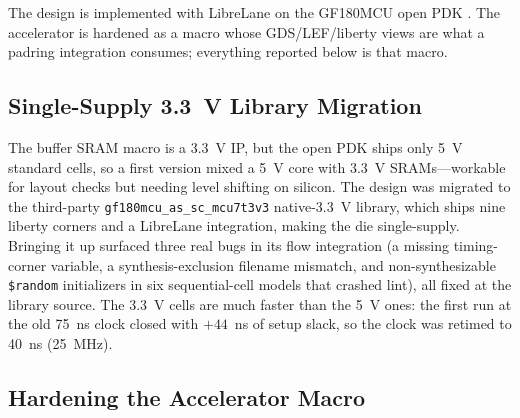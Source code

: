 \documentclass[conference,a4paper]{APSIPA2026}
\begin{document}
The design is implemented with LibreLane \cite{librelane} on the GF180MCU open PDK \cite{gf180pdk}. The accelerator is hardened as a macro whose GDS/LEF/liberty views are what a padring integration consumes; everything reported below is that macro.

\subsection{Single-Supply 3.3~V Library Migration}
The buffer SRAM macro \cite{gf180sram} is a 3.3~V IP, but the open PDK ships only 5~V standard cells, so a first version mixed a 5~V core with 3.3~V SRAMs---workable for layout checks but needing level shifting on silicon. The design was migrated to the third-party \texttt{gf180mcu\_as\_sc\_mcu7t3v3} native-3.3~V library, which ships nine liberty corners and a LibreLane integration, making the die single-supply. Bringing it up surfaced three real bugs in its flow integration (a missing timing-corner variable, a synthesis-exclusion filename mismatch, and non-synthesizable \texttt{\$random} initializers in six sequential-cell models that crashed lint), all fixed at the library source. The 3.3~V cells are much faster than the 5~V ones: the first run at the old 75~ns clock closed with $+44$~ns of setup slack, so the clock was retimed to 40~ns (25~MHz).

\subsection{Hardening the Accelerator Macro}
\end{document}
